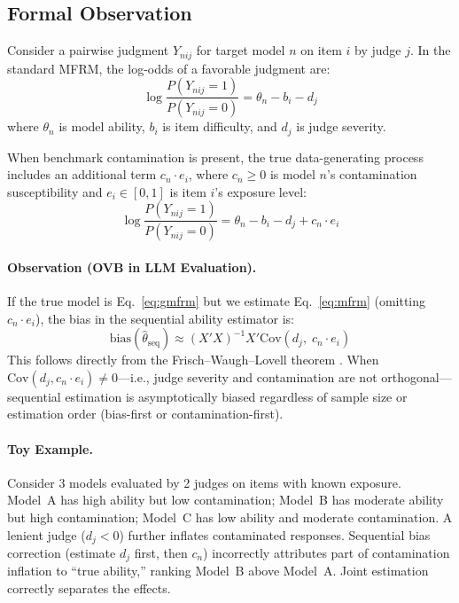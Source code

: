 \documentclass[11pt,twocolumn]{article}
\newcommand{\thetahat}{\hat{\theta}}
\begin{document}
\subsection{Formal Observation}

Consider a pairwise judgment $Y_{nij}$ for target model $n$ on item $i$ by judge $j$. In the standard MFRM, the log-odds of a favorable judgment are:
\begin{equation}
\log \frac{P(Y_{nij}=1)}{P(Y_{nij}=0)} = \theta_n - b_i - d_j
\label{eq:mfrm}
\end{equation}
where $\theta_n$ is model ability, $b_i$ is item difficulty, and $d_j$ is judge severity.

When benchmark contamination is present, the true data-generating process includes an additional term $c_n \cdot e_i$, where $c_n \geq 0$ is model $n$'s contamination susceptibility and $e_i \in [0,1]$ is item $i$'s exposure level:
\begin{equation}
\log \frac{P(Y_{nij}=1)}{P(Y_{nij}=0)} = \theta_n - b_i - d_j + c_n \cdot e_i
\label{eq:gmfrm}
\end{equation}

\paragraph{Observation (OVB in LLM Evaluation).} If the true model is Eq.~\ref{eq:gmfrm} but we estimate Eq.~\ref{eq:mfrm} (omitting $c_n \cdot e_i$), the bias in the sequential ability estimator is:
\begin{equation}
\text{bias}(\thetahat_{\text{seq}}) \approx (X'X)^{-1}X' \text{Cov}(d_j,\; c_n \cdot e_i)
\end{equation}
This follows directly from the Frisch--Waugh--Lovell theorem \citep{angrist2009mostly}. When $\text{Cov}(d_j, c_n \cdot e_i) \neq 0$---i.e., judge severity and contamination are not orthogonal---sequential estimation is asymptotically biased regardless of sample size or estimation order (bias-first or contamination-first).

\paragraph{Toy Example.} Consider 3 models evaluated by 2 judges on items with known exposure. Model~A has high ability but low contamination; Model~B has moderate ability but high contamination; Model~C has low ability and moderate contamination. A lenient judge ($d_j < 0$) further inflates contaminated responses. Sequential bias correction (estimate $d_j$ first, then $c_n$) incorrectly attributes part of contamination inflation to ``true ability,'' ranking Model~B above Model~A. Joint estimation correctly separates the effects.
\end{document}
